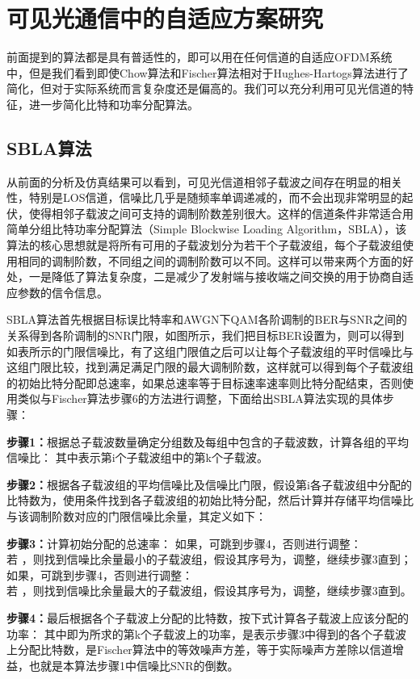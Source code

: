 \section{可见光通信中的自适应方案研究}
前面提到的算法都是具有普适性的，即可以用在任何信道的自适应OFDM系统中，但是我们看到即使Chow算法和Fischer算法相对于Hughes-Hartogs算法进行了简化，但对于实际系统而言复杂度还是偏高的。我们可以充分利用可见光信道的特征，进一步简化比特和功率分配算法。
\subsection{SBLA算法}
从前面的分析及仿真结果可以看到，可见光信道相邻子载波之间存在明显的相关性，特别是LOS信道，信噪比几乎是随频率单调递减的，而不会出现非常明显的起伏，使得相邻子载波之间可支持的调制阶数差别很大。这样的信道条件非常适合用简单分组比特功率分配算法（Simple Blockwise Loading Algorithm，SBLA）\cite{grunheid2000adaptive}，该算法的核心思想就是将所有可用的子载波划分为若干个子载波组，每个子载波组使用相同的调制阶数，不同组之间的调制阶数可以不同。这样可以带来两个方面的好处，一是降低了算法复杂度，二是减少了发射端与接收端之间交换的用于协商自适应参数的信令信息。

SBLA算法首先根据目标误比特率和AWGN下QAM各阶调制的BER与SNR之间的关系得到各阶调制的SNR门限，如图所示，我们把目标BER设置为，则可以得到如表所示的门限信噪比，有了这组门限值之后可以让每个子载波组的平时信噪比与这组门限比较，找到满足满足门限的最大调制阶数，这样就可以得到每个子载波组的初始比特分配即总速率，如果总速率等于目标速率速率则比特分配结束，否则使用类似与Fischer算法步骤6的方法进行调整，下面给出SBLA算法实现的具体步骤：
\begin{description}
\item{\bf{步骤1：}}根据总子载波数量确定分组数及每组中包含的子载波数，计算各组的平均信噪比：
其中表示第i个子载波组中的第k个子载波。
\item{\bf{步骤2：}}根据各子载波组的平均信噪比及信噪比门限，假设第i各子载波组中分配的比特数为，使用条件找到各子载波组的初始比特分配，然后计算并存储平均信噪比与该调制阶数对应的门限信噪比余量，其定义如下：
\item{\bf{步骤3：}}计算初始分配的总速率：
如果，可跳到步骤4，否则进行调整：\\
若 ，则找到信噪比余量最小的子载波组，假设其序号为，调整，继续步骤3直到；\\
如果，可跳到步骤4，否则进行调整：\\
若 ，则找到信噪比余量最大的子载波组，假设其序号为，调整，继续步骤3直到。\\
\item{\bf{步骤4：}}最后根据各个子载波上分配的比特数，按下式计算各子载波上应该分配的功率：
其中即为所求的第k个子载波上的功率，是表示步骤3中得到的各个子载波上分配比特数，是Fischer算法中的等效噪声方差，等于实际噪声方差除以信道增益，也就是本算法步骤1中信噪比SNR的倒数。
\end{description}

